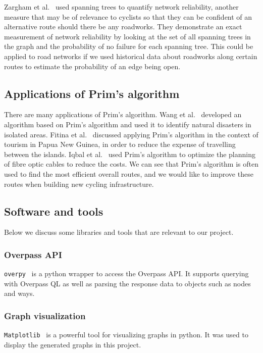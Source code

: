 \documentclass[12pt,a4paper]{report}
\begin{document}
Zargham et al.~\cite{zarghami2020} used spanning trees to quantify network reliability, another measure that may be of relevance to cyclists so that they can be confident of an alternative route should there be any roadworks. They demonstrate an exact measurement of network reliability by looking at the set of all spanning trees in the graph and the probability of no failure for each spanning tree. This could be applied to road networks if we used historical data about roadworks along certain routes to estimate the probability of an edge being open.

\subsection{Applications of Prim's algorithm}
There are many applications of Prim's algorithm. Wang et al.~\cite{wang2018} developed an algorithm based on Prim's algorithm and used it to identify natural disasters in isolated areas. Fitina et al.~\cite{fitina} discussed applying Prim's algorithm in the context of tourism in Papua New Guinea, in order to reduce the expense of travelling between the islands. Iqbal et al.~\cite{iqbal2017} used Prim's algorithm to optimize the planning of fibre optic cables to reduce the costs. We can see that Prim's algorithm is often used to find the most efficient overall routes, and we would like to improve these routes when building new cycling infrastructure. 

\subsection{Software and tools}
Below we discuss some libraries and tools that are relevant to our project.

\subsubsection*{Overpass API}
\texttt{overpy}~\cite{overpy} is a python wrapper to access the Overpass API. It supports querying with Overpass QL as well as parsing the response data to objects such as nodes and ways. 

\subsubsection*{Graph visualization}
\texttt{Matplotlib}~\cite{Hunter:2007} is a powerful tool for visualizing graphs in python. It was used to display the generated graphs in this project.
\end{document}
